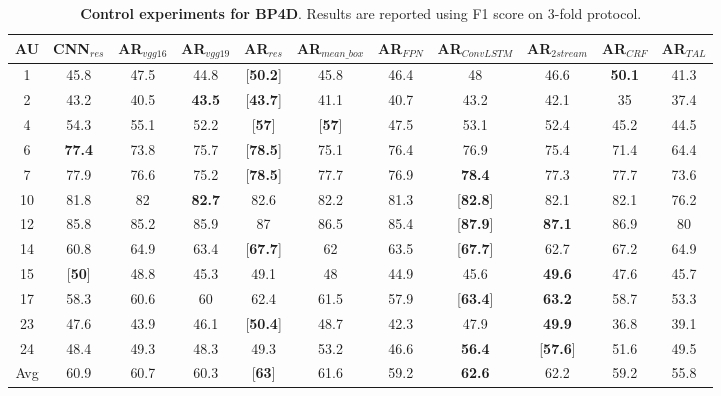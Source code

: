 \documentclass[5p,twocolumn]{elsarticle}
\begin{document}
 \begin{table*}[!htbp]
	\scriptsize
	\centering
	
	\setlength{\abovecaptionskip}{0pt} 
	
	\caption{\textbf{Control experiments for BP4D}. Results are reported using F1 score on 3-fold protocol.}
	\label{tab:BP4D_control_expr}
	
	\centering
	\tabcolsep=0.05cm
	\begin{tabular}{c*{10}{c}}
		
		\toprule
		AU & CNN$_{res}$ & AR$_{vgg16}$ & AR$_{vgg19}$ & AR$_{res}$ & AR$_{mean\_box}$ & AR$_{FPN}$ & AR$_{ConvLSTM}$ & AR$_{2stream}$ & AR$_{CRF}$ & AR$_{TAL}$ \\
		\midrule
		1 & 45.8 & 47.5 & 44.8 & [\textbf{50.2}] & 45.8 & 46.4 & 48 & 46.6& \textbf{50.1}& 41.3 \\
		2 & 43.2 & 40.5 & \textbf{43.5} & [\textbf{43.7}] & 41.1 & 40.7 & 43.2 & 42.1 &35 & 37.4 \\
		4 & 54.3 & 55.1 & 52.2 & [\textbf{57}] & [\textbf{57}] & 47.5 & 53.1 & 52.4 &45.2 & 44.5 \\
		6 & \textbf{77.4} & 73.8 & 75.7 & [\textbf{78.5}] & 75.1 & 76.4 & 76.9 & 75.4 &71.4 & 64.4 \\
		7 & 77.9 & 76.6 & 75.2 & [\textbf{78.5}] & 77.7 & 76.9 & \textbf{78.4} & 77.3 & 77.7 & 73.6 \\
		10 & 81.8 & 82 & \textbf{82.7} & 82.6 & 82.2 & 81.3 & [\textbf{82.8}] & 82.1 & 82.1 & 76.2 \\
		12 & 85.8 & 85.2 & 85.9 & 87 & 86.5 & 85.4 & [\textbf{87.9}] & \textbf{87.1} &86.9 & 80 \\
		14 & 60.8 & 64.9 & 63.4 & [\textbf{67.7}] & 62 & 63.5 & [\textbf{67.7}] & 62.7 &67.2 & 64.9 \\
		15 & [\textbf{50}] & 48.8 & 45.3 & 49.1 & 48 & 44.9 & 45.6 & \textbf{49.6}& 47.6& 45.7 \\
		17 & 58.3 & 60.6 & 60 & 62.4 & 61.5 & 57.9 & [\textbf{63.4}] & \textbf{63.2} & 58.7& 53.3 \\
		23 & 47.6 & 43.9 & 46.1 & [\textbf{50.4}] & 48.7 & 42.3 & 47.9 & \textbf{49.9} &36.8& 39.1 \\
		24 & 48.4 & 49.3 & 48.3 & 49.3 & 53.2 & 46.6 & \textbf{56.4} & [\textbf{57.6}] &51.6 & 49.5 \\
		\midrule
		Avg & 60.9 & 60.7 & 60.3 & [\textbf{63}] & 61.6 & 59.2 & \textbf{62.6} & 62.2 &59.2& 55.8 \\
		\bottomrule
	\end{tabular}
	\vspace{0.0cm}
\end{table*}
\end{document}
